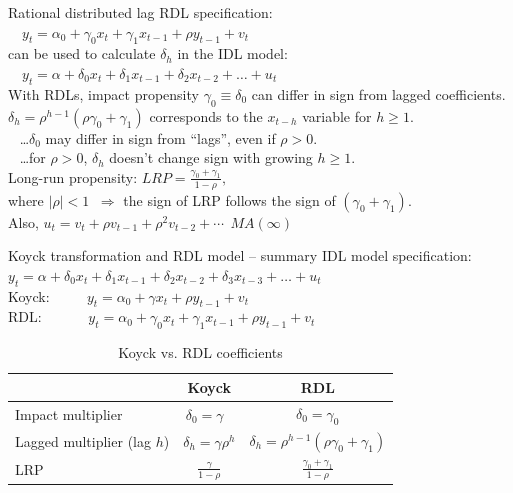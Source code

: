\documentclass{beamer}
\begin{document}
\begin{frame}{Rational distributed lag}
RDL specification:\\
\medskip
$\quad y_t = \alpha_0+\gamma_0 x_t +\gamma_1 x_{t-1} + \rho y_{t-1}  + v_t $\\
\medskip
can be used to calculate $\delta_h$ in the IDL model:\\
\medskip
$\quad y_t = \alpha + \delta_0 x_t  + \delta_1 x_{t-1} + \delta_2 x_{t-2} + \dots + u_t $\\
\medskip
With RDLs, impact propensity $\gamma_0 \equiv \delta_0$ can differ in sign from lagged coefficients. \\
\medskip
$\delta_h = \rho^{h-1}(\rho \gamma_0 + \gamma_1)$ corresponds to the $x_{t-h}$ variable for $h \geq 1$. \\
\smallskip
~ \dots $\delta_0$ may differ in sign from ``lags'', even if $\rho > 0$.\\
~ \dots for $\rho > 0$, $\delta_h$ doesn't change sign with growing $h \geq 1$. \\
\bigskip
Long-run propensity: $\textit{LRP} = \frac{\gamma_0 + \gamma_1}{1-\rho},$\\
\smallskip
where $|\rho| < 1$ $\> \Rightarrow$ the sign of LRP follows the sign of $(\gamma_0+\gamma_1)$. \\
\medskip
Also,  $u_t = v_t + \rho v_{t-1} + \rho^2 v_{t-2} + \cdots \> \>  MA(\infty)$
\end{frame}
\begin{frame}{Koyck transformation and RDL model -- summary}
IDL model specification:\\ \smallskip
$y_t = \alpha + \delta_0 x_t  + \delta_1 x_{t-1} + \delta_2 x_{t-2} + \delta_3 x_{t-3}+ \dots + u_t $\\
\bigskip
Koyck: $\qquad \,\, y_t = \alpha_0 + \gamma x_t + \rho y_{t-1} + v_t$\\
\smallskip
RDL: $\qquad \quad y_t = \alpha_0+\gamma_0 x_t +\gamma_1 x_{t-1} + \rho y_{t-1}  + v_t $\\
\bigskip
\begin{table}
\centering
\caption{Koyck vs. RDL coefficients}
\label{Tab1}
\begin{tabular}{|l|c|c|}
\hline
  & Koyck & RDL \\
  \hline 
Impact multiplier & $\delta_0=\gamma~~~$ & $\delta_0=\gamma_0$ \\
\hline
Lagged multiplier (lag $h$) & $\delta_h = \gamma \rho^h$ & $\delta_h = \rho^{h-1}(\rho \gamma_0 + \gamma_1)$ \\
\hline 
LRP & $\frac{\gamma}{1-\rho}$ & $\frac{\gamma_0 + \gamma_1}{1-\rho}$\\
\hline
\end{tabular}
\end{table} 

\end{frame}
\end{document}
